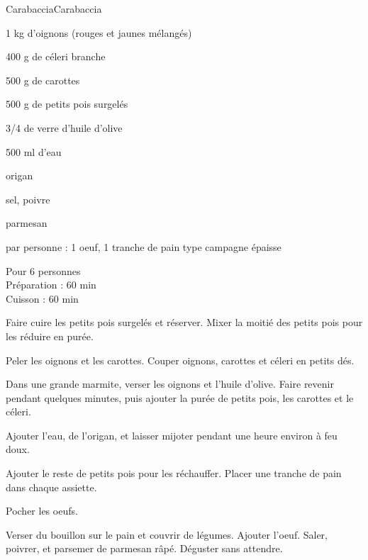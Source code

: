 \begin{recette}{Carabaccia}{Carabaccia}

\begin{ingredients}
1 kg d'oignons (rouges et jaunes mélangés)\par
400 g de céleri branche\par
500 g de carottes\par
500 g de petits pois surgelés\par
3/4 de verre d'huile d'olive\par
500 ml d'eau\par
origan\par
sel, poivre\par
parmesan\par
par personne : 1 oeuf, 1 tranche de pain type campagne épaisse\par
\end{ingredients}

\begin{infos}
Pour 6 personnes	\\
Préparation : 60 min\\
Cuisson : 60 min\\
\end{infos}

\begin{etapes}
\item Faire cuire les petits pois surgelés et réserver. Mixer la moitié des petits pois pour les réduire en purée.
\item Peler les oignons et les carottes. Couper oignons, carottes et céleri en petits dés.
\item Dans une grande marmite, verser les oignons et l’huile d’olive. Faire revenir pendant quelques minutes, puis ajouter  la purée de petits pois, les carottes et le céleri.
\item Ajouter l’eau, de l’origan, et laisser mijoter pendant une heure environ à feu doux.
\item Ajouter le reste de petits pois pour les réchauffer. Placer une tranche de pain dans chaque assiette.
\item Pocher les oeufs.
\item Verser du bouillon sur le pain et couvrir de légumes. Ajouter l'oeuf. Saler, poivrer, et parsemer de parmesan râpé. Déguster sans attendre.
\end{etapes}

\end{recette}